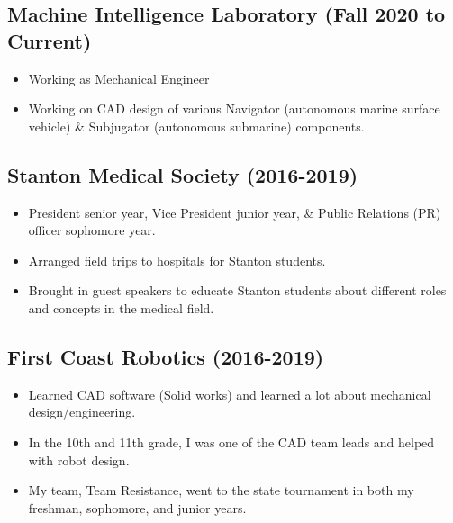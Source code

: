 \documentclass{article}
\newenvironment{CustomItemize}
{ \begin{itemize}[leftmargin=1em]
    \setlength{\itemsep}{0pt}
    \setlength{\parskip}{0pt}
    \setlength{\parindent}{0pt}
    \setlength{\parsep}{0pt}     }
{ \end{itemize}                  }
\begin{document}
\subsection{Machine Intelligence Laboratory (Fall 2020 to Current)}
\begin{CustomItemize}
\item Working as Mechanical Engineer
\item Working on CAD design of various Navigator (autonomous marine surface vehicle) \& Subjugator (autonomous submarine) components.
\end{CustomItemize}

\subsection{Stanton Medical Society (2016-2019)}
\begin{CustomItemize}
\item President senior year, Vice President junior year, \& Public Relations (PR) officer sophomore year.
\item Arranged field trips to hospitals for Stanton students.
\item Brought in guest speakers to educate Stanton students about different roles and concepts in the medical field. 
\end{CustomItemize}

\subsection{First Coast Robotics (2016-2019)}
\begin{CustomItemize}
\item Learned CAD software (Solid works) and learned a lot about mechanical design/engineering.
\item In the 10th and 11th grade, I was one of the CAD team leads and helped with robot design.
\item My team, Team Resistance, went to the state tournament in both my freshman, sophomore, and junior years. 
\end{CustomItemize}


\end{document}
